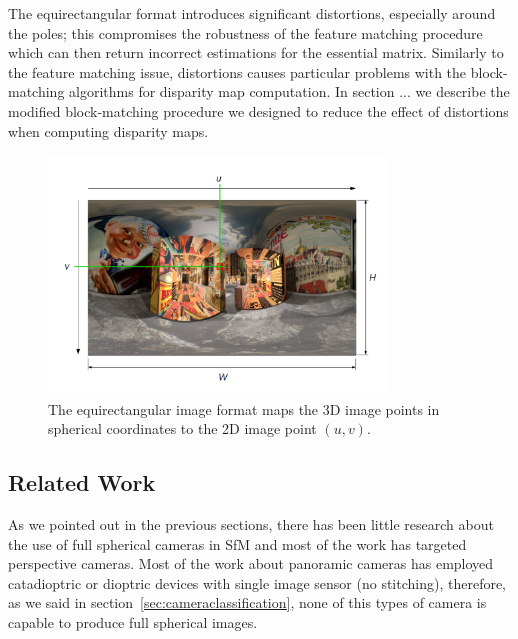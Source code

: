 The equirectangular format introduces significant distortions, especially 
around the poles; this compromises the robustness of the feature matching 
procedure which can then return incorrect estimations for the essential 
matrix.
Similarly to the feature matching issue, distortions causes particular problems
with the block-matching algorithms for disparity map computation.
In section ... we describe the modified 
block-matching procedure we designed to reduce the effect of distortions 
when computing disparity maps.
\begin{figure}[h]
	\centering
	\includegraphics[width=0.8\textwidth]{img/equirectangular}
	\caption{The equirectangular image format maps the 3D image points in 
	spherical coordinates to the 2D image point $(u, v)$.}
	\label{fig:equirectangular}
\end{figure}

\subsection{Related Work}
\label{subsec:related_work}
As we pointed out in the previous sections, there has been little research 
about the use of full spherical cameras in SfM and most of the work
has targeted perspective cameras.
Most of the work about panoramic cameras has employed catadioptric or dioptric 
devices with single image sensor (no stitching), therefore, as we said in 
section~\ref{sec:cameraclassification}, none of this types of camera is capable
to produce full spherical images.

